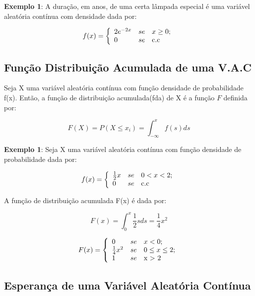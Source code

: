 \documentclass[a4paper,12pt]{report}
\begin{document}
{\textbf{Exemplo 1}: A duração, em anos, de uma certa lâmpada
especial é uma variável aleatória contínua com densidade dada por:


$$
f(x)=
\left\{%
\begin{array}{ll}
   2e^{-2x}       & se \quad \hbox{$x \geq 0$;} \\
   0              & se \quad \hbox{c.c} \\
\end{array}%
\right.
$$



\subsection{Função Distribuição Acumulada de uma V.A.C}

Seja X uma variável aleatória contínua com função densidade de
probabilidade f(x). Então, a função de distribuição acumulada(fda)
de X é a função $F$ definida por:


\begin{equation}\label{F}
    F(X) = P(X\leq x_{i})= \int_{-\infty}^{x}f(s)ds
\end{equation}


\textbf{Exemplo 1}: Seja X uma variável aleatória contínua com
função densidade de probabilidade dada por:

$$
f(x)=
\left\{%
\begin{array}{ll}
   \frac{1}{2}x   & se \quad \hbox{$0 < x < 2$;} \\
   0              & se \quad \hbox{c.c} \\
\end{array}%
\right.
$$

A função de distribuição acumulada F(x) é dada por:

$$
F(x) = \int^{x}_{0}\frac{1}{2}sds = \frac{1}{4}x^{2}
$$

$$
F(x)=
\left\{%
\begin{array}{ll}
    0                 & se \quad \hbox{$x < 0$;} \\
   \frac{1}{4}x^{2}   & se \quad \hbox{$0 \leq x \leq 2$;} \\
   1                  & se \quad \hbox{x > 2} \\
\end{array}%
\right.
$$


\subsection{Esperança de uma Variável Aleatória Contínua}

}
\end{document}
